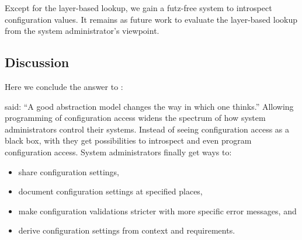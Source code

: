 Except for the layer-based lookup, we gain a futz-free system to introspect configuration values.
It remains as future work to evaluate the layer-based lookup from the system administrator's viewpoint.



\subsection{Discussion}

Here we conclude the answer to :
\rqImplicationAdministration*


\citet{evard1997analysis} said: \enquote{A good abstraction model changes the way in which one thinks.}
Allowing programming of configuration access widens the spectrum of how system administrators control their systems.
Instead of seeing configuration access as a black box, with  they get possibilities to introspect and even program configuration access.
System administrators finally get ways to:
\begin{itemize}
\item share configuration settings,
\item document configuration settings at specified places,
\item make configuration validations stricter with more specific error messages, and
\item derive configuration settings from context and requirements.
\end{itemize}


